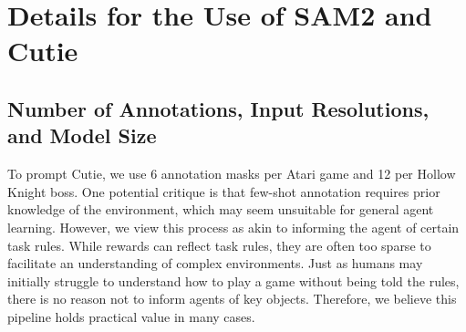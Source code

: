 \begin{table}[h]
    \centering
    \caption{Average system-level runtime (ms) of the proposed model on a single NVIDIA RTX 4090 GPU, with segmentation inputs at a resolution of 420$\times$320 pixels. 
    The 10 objects case uses a manually constructed synthetic configuration for testing.}
    \label{tab:system_metrics}
\end{table}

\section{Details for the Use of SAM2 and Cutie}
\subsection{Number of Annotations, Input Resolutions, and Model Size}
To prompt Cutie, we use 6 annotation masks per Atari game and 12 per Hollow Knight boss.
One potential critique is that few-shot annotation requires prior knowledge of the environment, which may seem unsuitable for general agent learning.
However, we view this process as akin to informing the agent of certain task rules.
While rewards can reflect task rules, they are often too sparse to facilitate an understanding of complex environments.
Just as humans may initially struggle to understand how to play a game without being told the rules, there is no reason not to inform agents of key objects.
Therefore, we believe this pipeline holds practical value in many cases.

